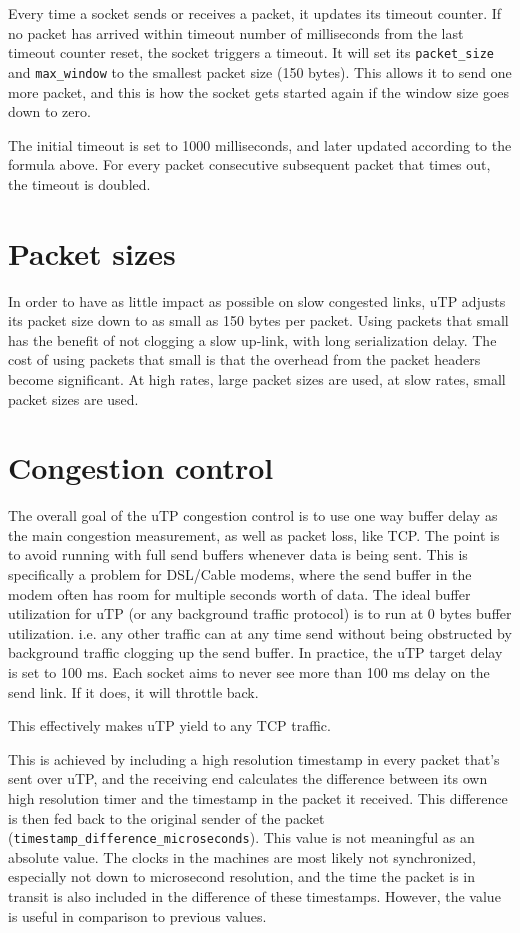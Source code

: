 \documentclass[11pt,a4paper,oneside,draft]{article}
\begin{document}
Every time a socket sends or receives a packet, it updates its timeout counter. If no packet has arrived within timeout number of milliseconds from the last timeout counter reset, the socket triggers a timeout. It will set its {\tt packet\_size} and {\tt max\_window} to the smallest packet size (150 bytes). This allows it to send one more packet, and this is how the socket gets started again if the window size goes down to zero.

The initial timeout is set to 1000 milliseconds, and later updated according to the formula above. For every packet consecutive subsequent packet that times out, the timeout is doubled.

{\section {Packet sizes}}

In order to have as little impact as possible on slow congested links, uTP adjusts its packet size down to as small as 150 bytes per packet. Using packets that small has the benefit of not clogging a slow up-link, with long serialization delay. The cost of using packets that small is that the overhead from the packet headers become significant. At high rates, large packet sizes are used, at slow rates, small packet sizes are used.

{\section {Congestion control}}

The overall goal of the uTP congestion control is to use one way buffer delay as the main congestion measurement, as well as packet loss, like TCP. The point is to avoid running with full send buffers whenever data is being sent. This is specifically a problem for DSL/Cable modems, where the send buffer in the modem often has room for multiple seconds worth of data. The ideal buffer utilization for uTP (or any background traffic protocol) is to run at 0 bytes buffer utilization. i.e. any other traffic can at any time send without being obstructed by background traffic clogging up the send buffer. In practice, the uTP target delay is set to 100 ms. Each socket aims to never see more than 100 ms delay on the send link. If it does, it will throttle back.

This effectively makes uTP yield to any TCP traffic.

This is achieved by including a high resolution timestamp in every packet that's sent over uTP, and the receiving end calculates the difference between its own high resolution timer and the timestamp in the packet it received. This difference is then fed back to the original sender of the packet ({\tt timestamp\_diffe\-rence\_microseconds}). This value is not meaningful as an absolute value. The clocks in the machines are most likely not synchronized, especially not down to microsecond resolution, and the time the packet is in transit is also included in the difference of these timestamps. However, the value is useful in comparison to previous values.
\end{document}
